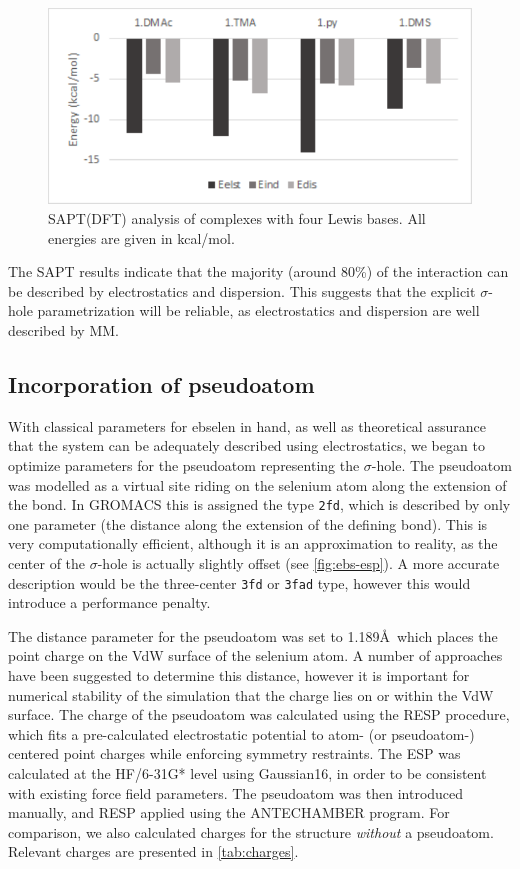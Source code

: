 \begin{refsection}
\begin{figure}
    \centering
    \includegraphics[width=0.75\linewidth]{Figures/sapt-eda.pdf}
    \caption[SAPT(DFT) analysis of complexes with four Lewis bases.]{SAPT(DFT) analysis of complexes with four Lewis bases. All energies are given in kcal/mol.}
    \label{fig:eda}
\end{figure}

The SAPT results indicate that the majority (around 80\%) of the interaction can be described by electrostatics and dispersion.
This suggests that the explicit $\sigma$-hole parametrization will be reliable, as electrostatics and dispersion are well described by MM.

\subsection{Incorporation of pseudoatom}
With classical parameters for ebselen in hand, as well as theoretical assurance that the system can be adequately described using electrostatics, we began to optimize parameters for the pseudoatom representing the $\sigma$-hole.
The pseudoatom was modelled as a virtual site riding on the selenium atom along the extension of the  bond.
In GROMACS this is assigned the type \texttt{2fd}, which is described by only one parameter (the distance along the extension of the defining bond).
This is very computationally efficient, although it is an approximation to reality, as the center of the $\sigma$-hole is actually slightly offset (see \cref{fig:ebs-esp}).
A more accurate description would be the three-center \texttt{3fd} or \texttt{3fad} type, however this would introduce a performance penalty.

The distance parameter for the pseudoatom was set to 1.189\AA\ which places the point charge on the VdW surface of the selenium atom.
A number of approaches have been suggested to determine this distance, however it is important for numerical stability of the simulation that the charge lies on or within the VdW surface.\autocite{Hobza2012}
The charge of the pseudoatom was calculated using the RESP procedure, which fits a pre-calculated electrostatic potential to atom- (or pseudoatom-) centered point charges while enforcing symmetry restraints.
The ESP was calculated at the HF/6-31G* level using Gaussian16, in order to be consistent with existing force field parameters.
The pseudoatom was then introduced manually, and RESP applied using the ANTECHAMBER program.
For comparison, we also calculated charges for the structure \emph{without} a pseudoatom.
Relevant charges are presented in \cref{tab:charges}.


\end{refsection}
